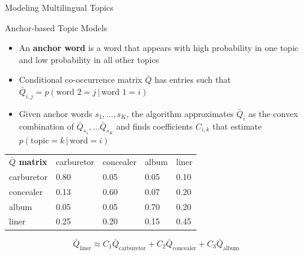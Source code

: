 \documentclass[final, 20pt]{beamer}
\newcommand{\g}{\, | \,}
\newlength{\colwidth}
\begin{document}
\begin{frame}[t]
\begin{columns}[t]
\begin{column}{\colwidth}
\begin{block}{Modeling Multilingual Topics}
  \end{block}

  \begin{block}{Anchor-based Topic Models}

\begin{itemize}
    \item  An \textbf{anchor word} is a word that appears with high probability in one topic and low probability in all other topics
    \item Conditional co-occurrence matrix $\bar{Q}$ has entries such that \(\bar{Q}_{i,j} = p(\text{word 2} = j \g \text{word 1} = i) \)
    \item Given anchor words \(s_1, \dots,s_K\), the algorithm approximates \(\bar{Q}_{i}\) as the convex combination of \(\bar{Q}_{s_1}, \dots \bar{Q}_{s_K} \) and finds coefficients $C_{i,k}$ that estimate $p(\text{topic} = k \g \text{word}=i )$
\end{itemize}
   
    	

\begin{table}[]
	\begin{tabular}{lllll}
		\textbf{$\bar{Q}$ matrix} & carburetor                & concealer                 & album                     & liner                     \\ \cline{2-5} 
		\multicolumn{1}{l|}{carburetor} & \multicolumn{1}{l|}{0.80} & \multicolumn{1}{l|}{0.05} & \multicolumn{1}{l|}{0.05} & \multicolumn{1}{l|}{0.10} \\ \cline{2-5} 
		\multicolumn{1}{l|}{concealer}  & \multicolumn{1}{l|}{0.13} & \multicolumn{1}{l|}{0.60} & \multicolumn{1}{l|}{0.07} & \multicolumn{1}{l|}{0.20} \\ \cline{2-5} 
		\multicolumn{1}{l|}{album}      & \multicolumn{1}{l|}{0.05} & \multicolumn{1}{l|}{0.05} & \multicolumn{1}{l|}{0.70} & \multicolumn{1}{l|}{0.20} \\ \cline{2-5} 
		\multicolumn{1}{l|}{liner}      & \multicolumn{1}{l|}{0.25} & \multicolumn{1}{l|}{0.20} & \multicolumn{1}{l|}{0.15} & \multicolumn{1}{l|}{0.45} \\ \cline{2-5} 
	\end{tabular}
\end{table}

\begin{equation}
\bar{Q}_{\text{liner}} \approx C_1 \bar{Q}_{\text{carburetor}} + C_2 \bar{Q}_{\text{concealer}} + C_3 \bar{Q}_{\text{album}}
\label{eq:q}
\end{equation}



\end{block}
\end{column}
\end{columns}
\end{frame}
\end{document}
